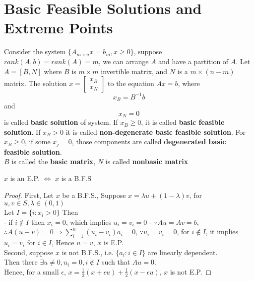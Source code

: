 		\section{Basic Feasible Solutions and Extreme Points}
			\begin{definition}
				Consider the system $\{A_{m\times n}x=b_m, x\ge 0\}$, suppose $rank(A, b) = rank(A) =m$, we can arrange $A$ and have a partition of $A$. Let $A=[B, N]$ where $B$ is $m\times m$ invertible matrix, and $N$ is a $m\times (n-m)$ matrix. The solution $x=\left[\begin{matrix}x_B\\x_N\end{matrix}\right]$ to the equation $Ax=b$, where
				\begin{equation}
					x_B = B^{-1}b 
				\end{equation}
				and
				\begin{equation}
					x_N = 0 
				\end{equation}
				is called \textbf{basic solution} of system. If $x_B \ge 0$, it is called \textbf{basic feasible solution}. If $x_B > 0$ it is called \textbf{non-degenerate basic feasible solution}. For $x_B \ge 0$, if some $x_j = 0$, those components are called \textbf{degenerated basic feasible solution}.\\
				$B$ is called the \textbf{basic matrix}, $N$ is called \textbf{nonbasic matrix}				
			\end{definition}

			\begin{theorem}
				$x$ is an E.P. $\iff$ $x$ is a B.F.S
			\end{theorem}
			
			\begin{proof}
				First, Let $x$ be a B.F.S., Suppose $x=\lambda u + (1 - \lambda) v$, for $u, v \in S, \lambda \in (0, 1)$\\
				Let $I = \{i: x_i > 0\}$ Then\\
				- if $i \notin I$ then $x_i = 0$, which implies $u_i = v_i = 0$
				- $\because Au = Av = b$, $\therefore A(u-v) = 0 \Rightarrow \sum_{i=1}^n(u_i - v_i)a_i = 0$, $\because u_i = v_i = 0$, for $i\notin I$, it implies $u_i = v_i$ for $i\in I$, Hence $u=v$, $x$ is E.P.\\
				Second, suppose $x$ is not B.F.S., i.e. $\{a_i: i \in I\}$ are linearly dependent.\\
				Then there $\exists u\ne 0, u_i =0 , i\notin I$ such that $Au=0$.\\
				Hence, for a small $\epsilon$, $x=\frac12(x + \epsilon u) + \frac12(x - \epsilon u)$, $x$ is not E.P.					
			\end{proof}

